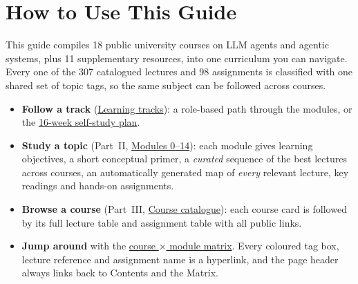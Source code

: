 \documentclass[10pt,oneside]{report}
\newcommand{\tg}[1]{{\setlength{\fboxsep}{1.2pt}\colorbox{tag#1}{\kern1pt\textcolor{white}{\sffamily\bfseries\fontsize{5.5}{6}\selectfont\strut #1}\kern1.5pt}}}
\begin{document}
\chapter{How to Use This Guide}
This guide compiles 18 public university courses on LLM agents and agentic systems, plus 11 supplementary resources, into one curriculum you can navigate.
Every one of the 307 catalogued lectures and 98 assignments is classified with one shared set of topic tags, so the same subject can be followed across courses.
\begin{infobox}[title=Four ways in]
\begin{itemize}
\item \textbf{Follow a track} (\hyperlink{tracks}{Learning tracks}): a role-based path through the modules, or the \hyperlink{plan16}{16-week self-study plan}.
\item \textbf{Study a topic} (Part~II, \hyperlink{mod-SETUP}{Modules 0--14}): each module gives learning objectives, a short conceptual primer, a \emph{curated} sequence of the best lectures across courses, an automatically generated map of \emph{every} relevant lecture, key readings and hands-on assignments.
\item \textbf{Browse a course} (Part~III, \hyperlink{catalog}{Course catalogue}): each course card is followed by its full lecture table and assignment table with all public links.
\item \textbf{Jump around} with the \hyperlink{navmatrix}{course $\times$ module matrix}. Every coloured tag box, lecture reference and assignment name is a hyperlink, and the page header always links back to Contents and the Matrix.
\end{itemize}
\end{infobox}
\end{document}
